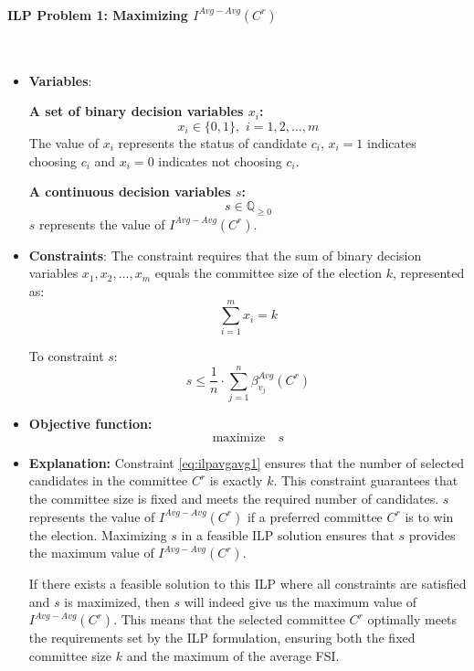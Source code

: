 \documentclass{article}
\begin{document}
\paragraph*{ILP Problem 1: Maximizing  $I^{Avg-Avg}(C^{r})$}
\
\begin{itemize}
  \item \textbf{Variables}: 

\textbf{A set of binary decision variables $x_i$:} \[  x_i \in \{0, 1\} , \,\, i=1,2,\dots, m \] The value of $x_i$ represents the status of candidate $c_i$, \(x_i = 1\) indicates choosing $c_i$ and \(x_i = 0\) indicates not choosing $c_i$.


\textbf{A continuous decision variables $s$:} 
\[  s\in \mathbb{Q}_{\geq 0} \]  
$s$ represents the value of $I^{Avg-Avg}(C^{r})$.
    \item \textbf{Constraints}:
The constraint requires that the sum of binary decision variables \(x_1, x_2, \ldots, x_m\) equals the committee size of the election \(k\), represented as:
\begin{equation} \sum_{i=1}^m x_i = k     \label{eq:ilpavgavg1}
\end{equation}

To constraint $s$:
\begin{equation}
s \leq \frac{1}{n}\cdot \sum_{j=1}^{n} \beta_{v_j}^{Avg}(C^{r})
\end{equation}
  
  \item  \textbf{Objective function:}
  \[\text{maximize} \quad s\]

 \item  \textbf{Explanation:}
Constraint \ref{eq:ilpavgavg1} ensures that the number of selected candidates in the committee \(C^r\) is exactly \(k\). This constraint guarantees that the committee size is fixed and meets the required number of candidates. \(s\) represents the value of $I^{Avg-Avg}(C^{r})$ if a preferred committee \(C^r\) is to win the election. Maximizing \(s\) in a feasible ILP solution ensures that \(s\) provides the maximum value of \(I^{Avg-Avg}(C^{r})\). 

If there exists a feasible solution to this ILP where all constraints are satisfied and \(s\) is maximized, then \(s\) will indeed give us the maximum value of \(I^{Avg-Avg}(C^{r})\). This means that the selected committee \(C^r\) optimally meets the requirements set by the ILP formulation, ensuring both the fixed committee size \(k\) and the maximum of the average FSI. 
\end{itemize}
\end{document}
